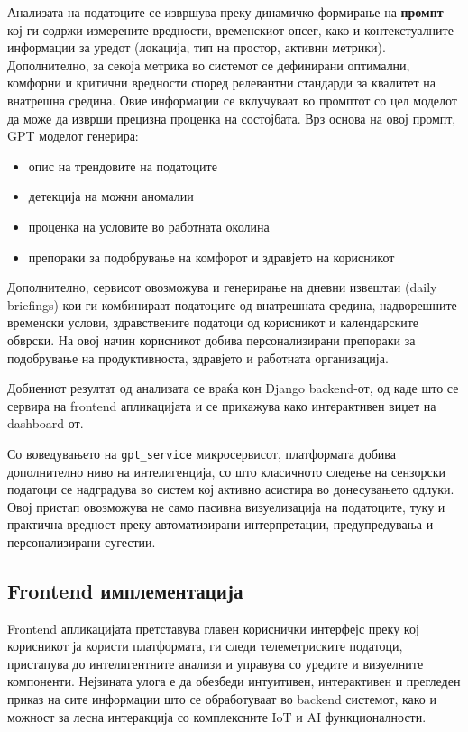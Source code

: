 Анализата на податоците се извршува преку динамичко формирање на \textbf{промпт} кој ги содржи измерените вредности, временскиот опсег, како и контекстуалните информации за уредот (локација, тип на простор, активни метрики). Дополнително, за секоја метрика во системот се дефинирани оптимални, комфорни и критични вредности според релевантни стандарди за квалитет на внатрешна средина. Овие информации се вклучуваат во промптот со цел моделот да може да изврши прецизна проценка на состојбата.
 Врз основа на овој промпт, GPT моделот генерира:
\begin{itemize}
    \item опис на трендовите на податоците
    \item детекција на можни аномалии
    \item проценка на условите во работната околина
    \item препораки за подобрување на комфорот и здравјето на корисникот
\end{itemize}

Дополнително, сервисот овозможува и генерирање на дневни извештаи (daily briefings) кои ги комбинираат податоците од внатрешната средина, надворешните временски услови, здравствените податоци од корисникот и календарските обврски. На овој начин корисникот добива персонализирани препораки за подобрување на продуктивноста, здравјето и работната организација.

Добиениот резултат од анализата се враќа кон Django backend-от, од каде што се сервира на frontend апликацијата и се прикажува како интерактивен виџет на dashboard-от.

Со воведувањето на \texttt{gpt\_service} микросервисот, платформата добива дополнително ниво на интелигенција, со што класичното следење на сензорски податоци се надградува во систем кој активно асистира во донесувањето одлуки. Овој пристап овозможува не само пасивна визуелизација на податоците, туку и практична вредност преку автоматизирани интерпретации, предупредувања и персонализирани сугестии.

\subsection{Frontend имплементација}

Frontend апликацијата претставува главен кориснички интерфејс преку кој корисникот ја користи платформата, ги следи телеметриските податоци, пристапува до интелигентните анализи и управува со уредите и визуелните компоненти. Нејзината улога е да обезбеди интуитивен, интерактивен и прегледен приказ на сите информации што се обработуваат во backend системот, како и можност за лесна интеракција со комплексните IoT и AI функционалности.

